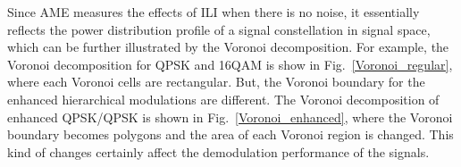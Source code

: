 \documentclass[10pt,fleqn, twocolumn]{IEEEtran}
\begin{document}
Since AME measures the effects of ILI when there is no noise, it
essentially reflects the power distribution profile of a signal
constellation in signal space, which can be further illustrated by
the Voronoi decomposition. For example, the Voronoi decomposition
for QPSK and 16QAM is show in Fig.~\ref{Voronoi_regular}, where
each Voronoi cells are rectangular. But, the Voronoi boundary for
the enhanced hierarchical modulations are different. The Voronoi
decomposition of enhanced QPSK/QPSK is shown in
Fig.~\ref{Voronoi_enhanced}, where the Voronoi boundary becomes
polygons and the area of each Voronoi region is changed. This kind
of changes certainly affect the demodulation performance of the
signals.
\begin{figure} 
\end{figure}
\begin{figure} 
\end{figure}
\end{document}
